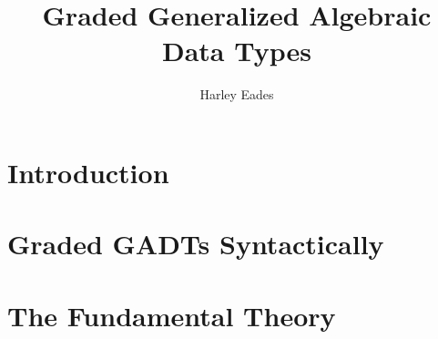 \documentclass[12pt]{article}
\title{Graded Generalized Algebraic Data Types}
\author{Harley Eades}
\begin{document}
\maketitle

\begin{abstract}
  
\end{abstract}

\tableofcontents

\section{Introduction}
\label{sec:introduction}


\section{Graded GADTs Syntactically}
\label{sec:Graded GADTs Syntactically}


\section{The Fundamental Theory} 
\label{sec:The Fundamental Theory}




\appendix
\end{document}
